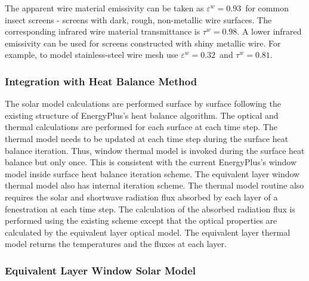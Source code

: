 The apparent wire material emissivity can be taken as $\varepsilon^w = 0.93$\ for common insect screens - screens with dark, rough, non-metallic wire surfaces. The corresponding infrared wire material transmittance is $\tau^w = 0.98$. A lower infrared emissivity can be used for screens constructed with shiny metallic wire. For example, to model stainless-steel wire mesh use $\varepsilon^w = 0.32$\ and $\tau^w = 0.81$.

\subsubsection{Integration with Heat Balance Method}\label{integration-with-heat-balance-method}

The solar model calculations are performed surface by surface following the existing structure of EnergyPlus's heat balance algorithm. The optical and thermal calculations are performed for each surface at each time step. The thermal model needs to be updated at each time step during the surface heat balance iteration. Thus, window thermal model is invoked during the surface heat balance but only once. This is consistent with the current EnergyPlus's window model inside surface heat balance iteration scheme. The equivalent layer window thermal model also has internal iteration scheme. The thermal model routine also requires the solar and shortwave radiation flux absorbed by each layer of a fenestration at each time step. The calculation of the absorbed radiation flux is performed using the existing scheme except that the optical properties are calculated by the equivalent layer optical model. The equivalent layer thermal model returns the temperatures and the fluxes at each layer.

\subsubsection{Equivalent Layer Window Solar Model}\label{equivalent-layer-window-solar-model}


